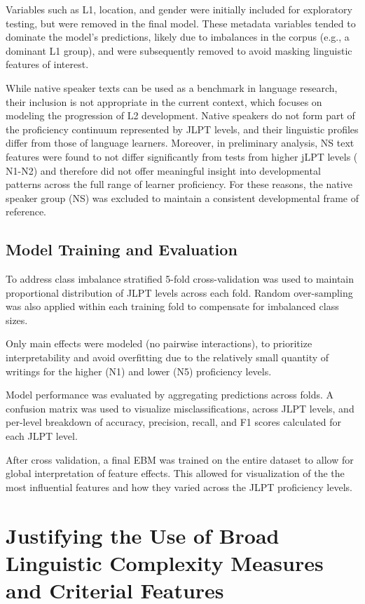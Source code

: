Variables such as L1, location, and gender were initially included for
exploratory
testing, but were removed in the final model. These metadata variables  tended to dominate the model's
predictions, likely due to imbalances in the corpus (e.g., a dominant L1 group), and were subsequently removed to avoid
masking linguistic features of interest.

While native speaker texts can be used as a benchmark in language research, their inclusion is not appropriate in
the current context, which focuses on modeling the progression of L2 development. Native speakers do not form part of
the proficiency continuum represented by JLPT levels, and their linguistic profiles differ from those
of language learners. Moreover, in preliminary analysis, NS text features were found to not differ significantly from
tests from higher jLPT levels (
N1-N2) and therefore did
not offer meaningful insight into developmental patterns across the full range of learner proficiency. For these
reasons, the native speaker group (NS) was excluded to maintain a consistent developmental frame of reference.

\subsection{Model Training and Evaluation}

To address class imbalance stratified 5-fold cross-validation was used to maintain proportional distribution of JLPT
levels across each fold. Random over-sampling was also applied within each training fold to compensate for
imbalanced class sizes.

Only main effects were modeled (no pairwise interactions), to prioritize interpretability and avoid overfitting
due to the relatively small quantity of writings for the higher (N1) and lower (N5) proficiency levels.

Model performance was evaluated by aggregating predictions across folds. A confusion
matrix was used to visualize misclassifications,
across JLPT levels, and per-level breakdown of accuracy, precision, recall, and F1 scores calculated for each JLPT
level.

After cross validation, a final EBM was trained on the entire dataset to allow for global interpretation of feature
effects. This allowed for visualization of the
the most influential features and how they varied across
the JLPT proficiency levels.

\section{Justifying the Use of Broad Linguistic Complexity Measures and Criterial Features}


